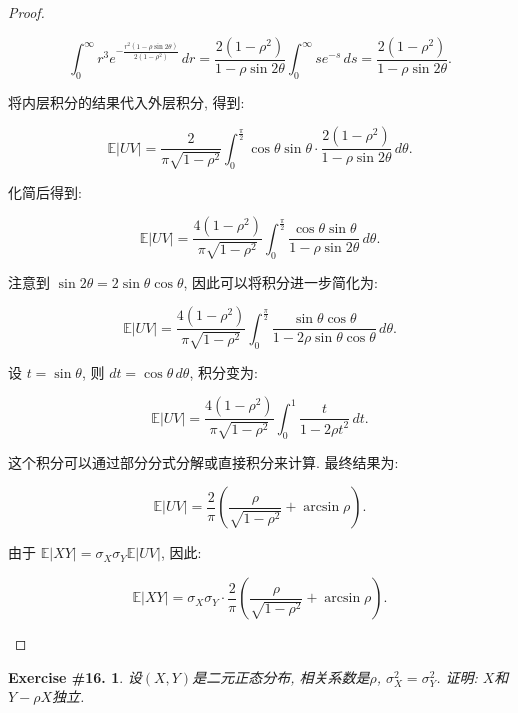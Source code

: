 \documentclass[UTF8, a4paper]{article}
\newtheorem{exercise}{Exercise \#16.}
\begin{document}
\begin{proof}
\begin{enumerate}[a)]
       \[
       \int_{0}^{\infty} r^3 e^{-\frac{r^2 (1 - \rho \sin 2\theta)}{2(1-\rho^2)}} \, dr = \frac{2(1-\rho^2)}{1 - \rho \sin 2\theta} \int_{0}^{\infty} s e^{-s} \, ds = \frac{2(1-\rho^2)}{1 - \rho \sin 2\theta}.
       \]

       将内层积分的结果代入外层积分, 得到: 
    
       \[
       \mathbb{E}|UV| = \frac{2}{\pi \sqrt{1-\rho^2}} \int_{0}^{\frac{\pi}{2}} \cos \theta \sin \theta \cdot \frac{2(1-\rho^2)}{1 - \rho \sin 2\theta} \, d\theta.
       \]
    
       化简后得到: 
    
       \[
       \mathbb{E}|UV| = \frac{4(1-\rho^2)}{\pi \sqrt{1-\rho^2}} \int_{0}^{\frac{\pi}{2}} \frac{\cos \theta \sin \theta}{1 - \rho \sin 2\theta} \, d\theta.
       \]

       注意到 \(\sin 2\theta = 2 \sin \theta \cos \theta\), 因此可以将积分进一步简化为: 
    
       \[
       \mathbb{E}|UV| = \frac{4(1-\rho^2)}{\pi \sqrt{1-\rho^2}} \int_{0}^{\frac{\pi}{2}} \frac{\sin \theta \cos \theta}{1 - 2 \rho \sin \theta \cos \theta} \, d\theta.
       \]
    
       设 \(t = \sin \theta\), 则 \(dt = \cos \theta \, d\theta\), 积分变为: 
    
       \[
       \mathbb{E}|UV| = \frac{4(1-\rho^2)}{\pi \sqrt{1-\rho^2}} \int_{0}^{1} \frac{t}{1 - 2 \rho t^2} \, dt.
       \]
    
       这个积分可以通过部分分式分解或直接积分来计算. 最终结果为: 
    
       \[
       \mathbb{E}|UV| = \frac{2}{\pi} \left( \frac{\rho}{\sqrt{1-\rho^2}} + \arcsin \rho \right).
       \]

       由于 \(\mathbb{E}|XY| = \sigma_X \sigma_Y \mathbb{E}|UV|\), 因此: 
    
       \[
       \mathbb{E}|XY| = \sigma_X \sigma_Y \cdot \frac{2}{\pi} \left( \frac{\rho}{\sqrt{1-\rho^2}} + \arcsin \rho \right).
       \]
    
    
\end{enumerate}
\end{proof}



\begin{framed}
\begin{exercise}
设\((X,Y)\)是二元正态分布, 相关系数是\(\rho\), \(\sigma_X^2 = \sigma_Y^2\).
证明: \(X\)和\(Y - \rho X\)独立.
\end{exercise}
\end{framed}
\end{document}
